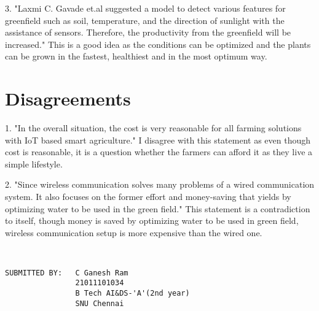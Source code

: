 \documentclass{article}
\begin{document}
3. "Laxmi C. Gavade et.al suggested a model to 
detect various features for greenfield such as soil, temperature, and the direction of sunlight with 
the assistance of sensors. Therefore, the productivity from the greenfield will be increased." This is a good idea as the conditions can be optimized and the plants can be grown in the fastest, healthiest and in the most optimum way.

\section{Disagreements}
1. "In the overall situation, the cost is very reasonable for all farming solutions with IoT based smart agriculture." I disagree with this statement as even though cost is reasonable, it is a question whether the farmers can afford it as they live a simple lifestyle.

2. "Since wireless communication solves many problems of a wired communication system. It also focuses on the former effort and money-saving that yields by optimizing water to be used in the green field." This statement is a contradiction to itself, though money is saved by optimizing water to be used in green field, wireless communication setup is more expensive than the wired one.




\begin{verbatim}


SUBMITTED BY:   C Ganesh Ram
                21011101034
                B Tech AI&DS-'A'(2nd year)
                SNU Chennai

\end{verbatim}
\end{document}
